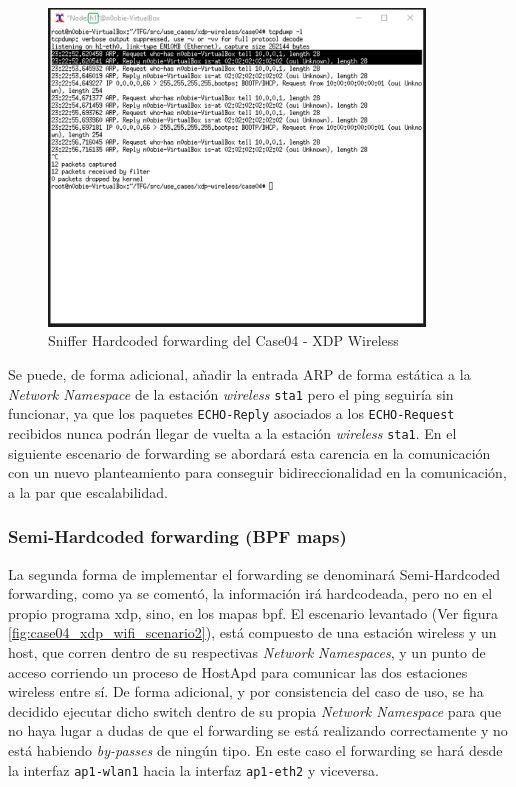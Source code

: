 \begin{figure}[ht!]
    \centering
    \includegraphics[width=10cm]{archivos/img/dev/xdp-wifi/case04/demo_case04_hard_2_Edited.png}
    \caption{Sniffer Hardcoded forwarding del Case04 - XDP Wireless}
    \label{fig:case04_xdp_wifi_func2}
\end{figure}

Se puede, de forma adicional, añadir la entrada ARP de forma estática a la \textit{Network Namespace} de la estación \textit{wireless} \texttt{sta1} pero el ping seguiría sin funcionar, ya que los paquetes \texttt{ECHO-Reply} asociados a los \texttt{ECHO-Request} recibidos nunca podrán llegar de vuelta a la estación \textit{wireless} \texttt{sta1}. En el siguiente escenario de forwarding se abordará esta carencia en la comunicación con un nuevo planteamiento para conseguir bidireccionalidad en la comunicación, a la par que escalabilidad.

\subsubsection{Semi-Hardcoded forwarding (BPF maps)}
\label{xdp_wifi_case04_semihard}

La segunda forma de implementar el forwarding se denominará Semi-Hardcoded forwarding, como ya se comentó, la información irá hardcodeada, pero no en el propio programa \gls{xdp}, sino, en los mapas \gls{bpf}. El escenario levantado (Ver figura \ref{fig:case04_xdp_wifi_scenario2}), está compuesto de una estación wireless y un host, que corren dentro de su respectivas \textit{Network Namespaces}, y un punto de acceso corriendo un proceso de HostApd para comunicar las dos estaciones wireless entre sí. De forma adicional, y por consistencia del caso de uso, se ha decidido ejecutar dicho switch dentro de su propia \textit{Network Namespace} para que no haya lugar a dudas de que el forwarding se está realizando correctamente y no está habiendo \textit{by-passes} de ningún tipo. En este caso el forwarding se hará desde la interfaz \texttt{ap1-wlan1} hacia la interfaz \texttt{ap1-eth2} y viceversa.


